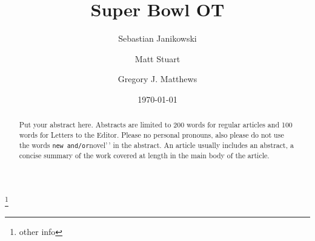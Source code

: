 \documentclass[preprint]{JASA}
\begin{document}

\title[A subtitle goes on another line]{Super Bowl OT}



\author{Sebastian Janikowski}
\thanks{other info}
\author{Matt Stuart}


\author{Gregory J. Matthews}






\date{\today}

\begin{abstract}
Put your abstract here. Abstracts are limited to 200 words for regular
articles and 100 words for Letters to the Editor. Please no personal
pronouns, also please do not use the words
\texttt{new\textquotesingle{}\textquotesingle{}\ and/or}novel'\,' in the
abstract. An article usually includes an abstract, a concise summary of
the work covered at length in the main body of the article.
\end{abstract}

\end{document}
